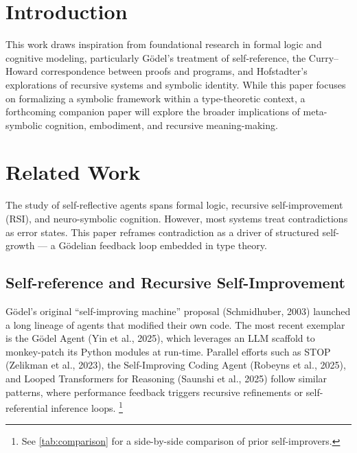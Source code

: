 \documentclass[manuscript,nonacm]{acmart}
\begin{document}
\maketitle

\section{Introduction}
This work draws inspiration from foundational research in formal logic and cognitive modeling, particularly Gödel\cite{godel1931incompleteness}'s treatment of self-reference, the Curry–Howard correspondence\cite{curryhoward} between proofs and programs, and Hofstadter\cite{hofstadter1979geb}'s explorations of recursive systems and symbolic identity. While this paper focuses on formalizing a symbolic framework within a type-theoretic context, a forthcoming companion paper will explore the broader implications of meta-symbolic cognition, embodiment, and recursive meaning-making.

\section{Related Work}
The study of self-reflective agents spans formal logic, recursive self-improvement (RSI), and neuro-symbolic cognition. However, most systems treat contradictions as error states. This paper reframes contradiction as a driver of structured self-growth — a Gödelian feedback loop embedded in type theory\cite{martinlof1984intuitionistic}.

\subsection{Self-reference and Recursive Self-Improvement}
Gödel’s original “self-improving machine” proposal (Schmidhuber, 2003)\cite{schmidhuber2003godel} launched a long lineage of agents that modified their own code. The most recent exemplar is the Gödel Agent (Yin et al., 2025)\cite{yin2025godelagent}, which leverages an LLM scaffold to monkey-patch its Python modules at run-time. Parallel efforts such as STOP (Zelikman et al., 2023)\cite{zelikman2023stop}, the Self-Improving Coding Agent (Robeyns et al., 2025)\cite{robeyns2025sica}, and Looped Transformers for Reasoning (Saunshi et al., 2025)\cite{saunshi2025looped} follow similar patterns, where performance feedback triggers recursive refinements or self-referential inference loops. \footnote{See \autoref{tab:comparison} for a side-by-side comparison of prior self-improvers.}
\end{document}
